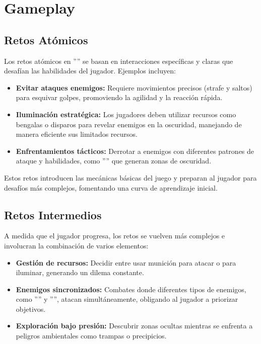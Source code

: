 \newpage

\section{Gameplay}
    \subsection{Retos Atómicos}
        Los retos atómicos en ''\gameTitle'' se basan en interacciones específicas y claras que desafían las habilidades del jugador. Ejemplos incluyen:
        \begin{itemize}
            \item \textbf{Evitar ataques enemigos:} Requiere movimientos precisos (strafe y saltos) para esquivar golpes, promoviendo la agilidad y la reacción rápida.

            \item \textbf{Iluminación estratégica:} Los jugadores deben utilizar recursos como bengalas o disparos para revelar enemigos en la oscuridad, manejando de manera eficiente sus limitados recursos.

            \item \textbf{Enfrentamientos tácticos:} Derrotar a enemigos con diferentes patrones de ataque y habilidades, como ''\darkneer'' que generan zonas de oscuridad.
        \end{itemize}
        Estos retos introducen las mecánicas básicas del juego y preparan al jugador para desafíos más complejos, fomentando una curva de aprendizaje inicial.
    \subsection{Retos Intermedios}
        A medida que el jugador progresa, los retos se vuelven más complejos e involucran la combinación de varios elementos:

        \begin{itemize}
            \item \textbf{Gestión de recursos:} Decidir entre usar munición para atacar o para iluminar, generando un dilema constante.

            \item \textbf{Enemigos sincronizados:} Combates donde diferentes tipos de enemigos, como ''\fodder'' y ''\ranger'', atacan simultáneamente, obligando al jugador a priorizar objetivos.

            \item \textbf{Exploración bajo presión:} Descubrir zonas ocultas mientras se enfrenta a peligros ambientales como trampas o precipicios.
        \end{itemize}

